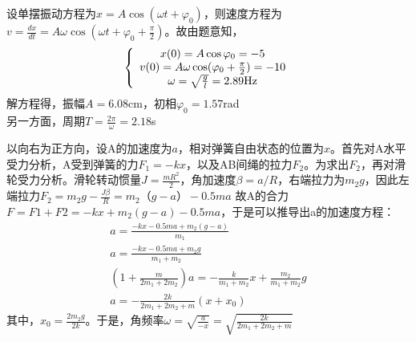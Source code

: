 \exercise

\solve
设单摆振动方程为$x=A\cos(\omega t+\varphi_0)$，则速度方程为$v=\frac{dx}{dt}=A\omega\cos(\omega t+\varphi_0+\frac{\pi}{2})$。故由题意知，
\begin{equation*}
  \left\{
   \begin{array}{c}
   x(0)=A\cos{\varphi_0} = -5  \\
   v(0)=A\omega\cos(\varphi_0+\frac{\pi}{2}) = -10  \\
   \omega=\sqrt{\frac{g}{l}}=2.89{\rm Hz}   \\
   \end{array}
  \right.
\end{equation*}
解方程得，振幅$A=6.08$cm，初相${\varphi_0}=1.57$rad\\
另一方面，周期$T=\frac{2\pi}{\omega}=2.18$s

\exercise

\solve
以向右为正方向，设A的加速度为$a$，相对弹簧自由状态的位置为$x$。首先对A水平受力分析，A受到弹簧的力$F_1=-kx$，以及AB间绳的拉力$F_2$。为求出$F_2$，再对滑轮受力分析。滑轮转动惯量$J=\frac{mR^2}{2}$，角加速度$\beta=a/R$，右端拉力为$m_2g$，因此左端拉力$F_2=m_2g-\frac{J\beta}{R}=m_2（g-a）-0.5ma$
故A的合力$F=F1+F2=-kx+m_2(g-a)-0.5ma$，于是可以推导出a的加速度方程：
\begin{equation*}
\begin{split}
a=\frac{-kx-0.5ma+m_2(g-a)}{m_1}\\
a=\frac{-kx-0.5ma+m_2g}{m_1+m_2}\\
(1+\frac{m}{2m_1+2m_2})a=-\frac{k}{m_1+m_2}x+\frac{m_2}{m_1+m_2}g\\
a=-\frac{2k}{2m_1+2m_2+m}(x+x_0)
\end{split}
\end{equation*}
其中，$x_0=\frac{2m_2g}{2k}$。于是，角频率$\omega=\sqrt{\frac{a}{-x}}=\sqrt{\frac{2k}{2m_1+2m_2+m}}$
